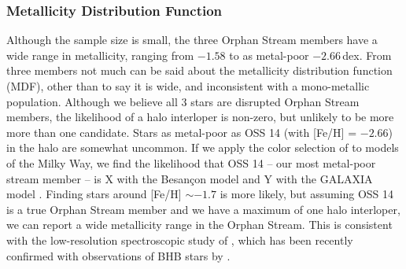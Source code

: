 \documentclass{emulateapj}
\begin{document}
\subsubsection{Metallicity Distribution Function}
Although the sample size is small, the three Orphan Stream members have a wide range in metallicity, ranging from $-1.58$ to as metal-poor $-2.66$\,dex. From three members not much can be said about the metallicity distribution function (MDF), other than to say it is wide, and inconsistent with a mono-metallic population. Although we believe all 3 stars are disrupted Orphan Stream members, the likelihood of a halo interloper is non-zero, but unlikely to be more more than one candidate. Stars as metal-poor as OSS 14 (with [Fe/H] = $-2.66$) in the halo are somewhat uncommon. If we apply the color selection of \citet{casey;et-al_2013} to models of the Milky Way, we find the likelihood that OSS 14 -- our most metal-poor stream member -- is X with the Besan\c{c}on model and Y with the GALAXIA model \citep{robin;et-al_2013, sharma;et-al_2012}. Finding stars around [Fe/H] $\sim -1.7$ is more likely, but assuming OSS 14 is a true Orphan Stream member and we have a maximum of one halo interloper, we can report a wide metallicity range in the Orphan Stream. This is consistent with the low-resolution spectroscopic study of \citet{casey;et-al_2013a}, which has been recently confirmed with observations of BHB stars by \citet{sesar;et-al_2013}.
\end{document}
